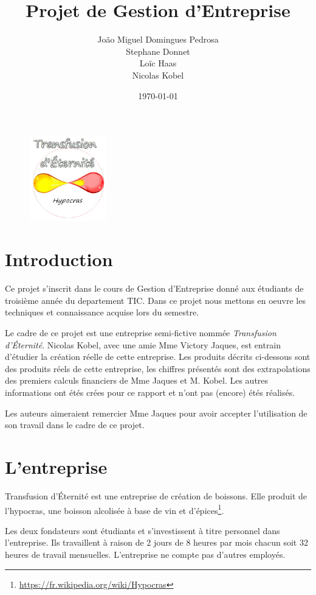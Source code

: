 \documentclass[10pt,a4paper]{article}
\title{Projet de Gestion d'Entreprise}
\subtitle{\tde{}}
\author{João Miguel Domingues Pedrosa \\ Stephane Donnet \\ Loïc Haas \\ Nicolas Kobel}
\date{\today}
\newcommand{\tde}{Transfusion d'Éternité}
\begin{document}
\maketitle
\tableofcontents
\hspace{0.4cm}
\begin{figure}[h]
\centering
\includegraphics[width=0.3\textwidth]{../images/logo.png}
\end{figure}
\newpage
\section{Introduction}
Ce projet s'inscrit dans le cours de Gestion d'Entreprise donné aux étudiants de troisième année du departement TIC.
Dans ce projet nous mettons en oeuvre les techniques et connaissance acquise lors du semestre.

Le cadre de ce projet est une entreprise semi-fictive nommée \textit{\tde{}}.
Nicolas Kobel, avec une amie Mme Victory Jaques, est entrain d'étudier la création réelle de cette entreprise.
Les produits décrits ci-dessous sont des produits réels de cette entreprise, les chiffres présentés sont des extrapolations des premiers calculs financiers de Mme Jaques et M. Kobel.
Les autres informations ont étés crées pour ce rapport et n'ont pas (encore) étés réalisés.

Les auteurs aimeraient remercier Mme Jaques pour avoir accepter l'utilisation de son travail dans le cadre de ce projet.
\newpage
\section{L'entreprise}
\tde{} est une entreprise de création de boissons.
Elle produit de l'hypocras, une boisson alcolisée à base de vin et d'épices\footnote{\url{https://fr.wikipedia.org/wiki/Hypocras}}.

Les deux fondateurs sont étudiants et s'investissent à titre personnel dans l'entreprise.
Ils travaillent à raison de 2 jours de 8 heures par mois chacun soit 32 heures de travail mensuelles.
L'entreprise ne compte pas d'autres employés.
\end{document}
